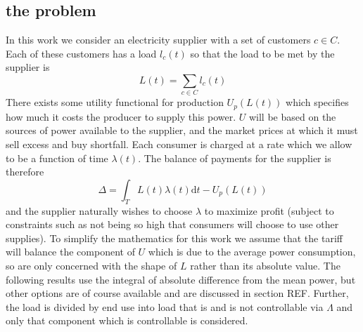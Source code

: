 \documentclass[a4paper, 10 pt, conference]{ieeeconf}  %
\begin{document}
\subsection{the problem}
In this work we consider an electricity supplier with a set of customers $c \in C$. Each of these customers has a load $l_{c}(t)$  so that the load to be met by the supplier is
\begin{equation}
L(t) = \sum_{c \in C} l_{c}(t)
\end{equation}
There exists some utility functional for production $U_{p}(L(t))$ which specifies how much it costs the producer to supply this power. $U$ will be based on the sources of power available to the supplier, and the market prices at which it must sell excess and buy shortfall.
Each consumer is charged at a rate which we allow to be a function of time $\lambda (t)$. The balance of payments for the supplier is therefore
\begin{equation}
\Delta = \int_{T}L(t) \lambda(t) \mathrm{d}t - U_{p}(L(t))
\end{equation}
and the supplier naturally wishes to choose $\lambda$ to maximize profit (subject to constraints such as not being so high that consumers will choose to use other supplies). To simplify the mathematics for this work we assume that the tariff will balance the component of $U$ which is due to the average power consumption, so are only concerned with the shape of $L$ rather than its absolute value. The following results use the integral of absolute difference from the mean power, but other options are of course available and are discussed in section REF.
Further, the load is divided by end use into load that is and is not controllable via $\Lambda$ and only that component which is controllable is considered.
\end{document}
